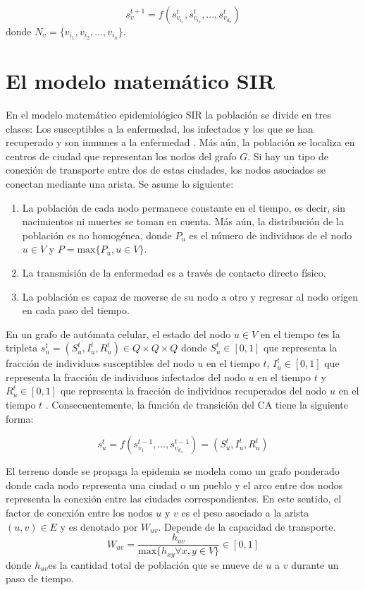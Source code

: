 \begin{equation}
	s_{v}^{t+1} = f(s_{v_{i_1} }^t, s_{v_{i_2} }^t,...,s_{v_{d_v} }^t)      
\end{equation}
donde $N_{v}= \{v_{i_1},v_{i_2},...,v_{i_n}\}$.

\section{El modelo matemático SIR}
En el modelo matemático epidemiológico SIR la población se divide en tres clases: Los susceptibles a la enfermedad, los infectados y los que se han recuperado y son inmunes a la enfermedad \cite{batista}. Más aún, la población se localiza en centros de ciudad que representan los nodos del grafo $G$. Si hay un tipo de conexión de transporte entre dos de estas ciudades, los nodos asociados se conectan mediante una arista. Se asume lo siguiente:

\begin{enumerate}
	\item La población de cada nodo permanece constante en el tiempo, es decir, sin nacimientos ni muertes se toman en cuenta. Más aún, la distribución de la población es no homogénea, donde $P_u$ es el número de  individuos de el nodo $u \in V$ y $P = \text{max}\{P_{u}, u \in V\}$.
	\item La transmisión de la enfermedad es a través de contacto directo físico.
	\item La población es capaz de moverse de su nodo a otro y regresar al nodo origen en cada paso del tiempo.
\end{enumerate}           

En un grafo de autómata celular, el estado del nodo $u \in V$  en el tiempo $t$es la tripleta $s_{u}^t = (S_{u}^t, I_{u}^t, R_{u}^t) \in Q \times Q \times Q  $ donde $S_{u}^t \in [0, 1]$ que representa la fracción de individuos susceptibles del nodo $u$ en el tiempo $t$, $I_{u}^t \in [0, 1]$ que representa la fracción de individuos infectados del nodo $u$ en el tiempo $t$  y $R_{u}^t \in [0, 1]$ que representa la fracción de individuos recuperados del nodo $u$ en el tiempo $t$ \cite{cagraph}.
Consecuentemente, la función de transición del CA tiene la siguiente forma:

\begin{equation}
	s_{u}^t=f(s_{v_1}^{t-1},...,s_{v_{d_u}}^{t-1} ) = (S_{u}^t, I_{u}^t, R_{u}^t)
\end{equation}

El terreno donde se propaga la epidemia se modela como un grafo ponderado donde cada nodo representa una ciudad o un pueblo y el arco entre dos nodos representa la conexión entre las ciudades correspondientes. En este sentido, el factor de conexión entre los nodos $u$ y $v$ es el peso asociado a la arista $(u, v) \in E$ y es denotado por $W_{u v}$. Depende de la capacidad de transporte.
\begin{equation}
	W_{u v} = \frac{ h_{u v} }  {\text{max} \{h_{xy} \forall x, y \in V \} } \in [0,1]
\end{equation}
donde $h_{u v}$es la cantidad total de población que se mueve de $u$ a $v$ durante un paso de tiempo.
\newpage

